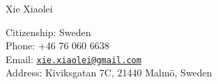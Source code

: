 \documentclass[10pt,letterpaper]{article}
\def\name{Xie Xiaolei}
\begin{document}
{\huge Xie Xiaolei}


\vspace{0.25in}

\begin{minipage}[t]{0.5\textwidth}
  Citizenship: Sweden \\
  Phone: +46 76 060 6638 \\
  Email: \href{mailto:xie.xiaolei@gmail.com}{\tt xie.xiaolei@gmail.com} \\
  Address: Kiviksgatan 7C, 21440 Malm\"{o}, Sweden
\end{minipage}

\end{document}
